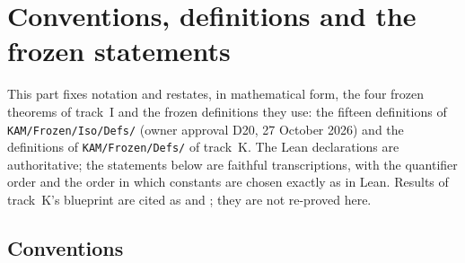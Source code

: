 \section{Conventions, definitions and the frozen statements}\label{bpI:p0}

This part fixes notation and restates, in mathematical form, the four frozen theorems of track~I and the
frozen definitions they use: the fifteen definitions of \texttt{KAM/Frozen/Iso/Defs/} (owner approval D20,
27 October 2026) and the definitions of \texttt{KAM/Frozen/Defs/} of track~K. The Lean declarations are
authoritative; the statements below are faithful transcriptions, with the quantifier order and the order in
which constants are chosen exactly as in Lean. Results of track~K's blueprint are cited as
 and ; they are not re-proved here.

\subsection{Conventions}\label{bpI:p0:conventions}

